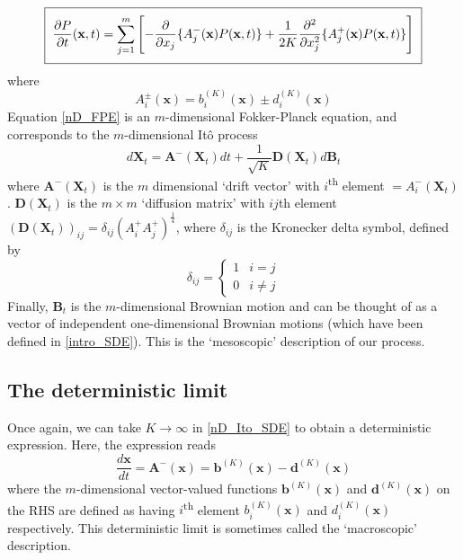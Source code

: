 \begin{equation}
\label{nD_FPE}
\setlength{\fboxsep}{2\fboxsep}\boxed{\frac{\partial P}{\partial t}(\mathbf{x},t) = \sum\limits_{j=1}^{m}\left[-\frac{\partial}{\partial x_j}\{A_j^{-}(\mathbf{x})P(\mathbf{x},t)\} + \frac{1}{2K}\frac{\partial^2}{\partial x_j^2}\{A_j^{+}(\mathbf{x})P(\mathbf{x},t)\}\right]}
\end{equation}
where
\begin{equation*}
A_{i}^{\pm}(\mathbf{x}) = b^{(K)}_i(\mathbf{x})\pm d^{(K)}_i(\mathbf{x})
\end{equation*}
Equation \eqref{nD_FPE} is an $m$-dimensional Fokker-Planck equation, and corresponds to the $m$-dimensional It\^o process
\begin{equation}
\label{nD_Ito_SDE}
d\mathbf{X}_{t} = \mathbf{A^-}(\mathbf{X}_t)dt + \frac{1}{\sqrt{K}}\mathbf{D}(\mathbf{X}_t)d\mathbf{B}_t
\end{equation}
where $\mathbf{A^-}(\mathbf{X}_t)$ is the $m$ dimensional `drift vector' with $i$\textsuperscript{th} element $ = A^{-}_{i}(\mathbf{X}_t)$. $\mathbf{D}(\mathbf{X}_t)$ is the $m \times m$ `diffusion matrix' with $ij$th element $\left(\mathbf{D}(\mathbf{X}_t)\right)_{ij} = \delta_{ij}\left(A^{+}_{i}A^{+}_{j}\right)^{\frac{1}{4}}$, where $\delta_{ij}$ is the Kronecker delta symbol, defined by
\begin{equation*}
\delta_{ij} = 
\begin{cases}
1 & i=j\\
0 & i\neq j
\end{cases}
\end{equation*}
Finally, $\mathbf{B}_t$ is the $m$-dimensional Brownian motion and can be thought of as a vector of independent one-dimensional Brownian motions (which have been defined in \ref{intro_SDE}). This is the `mesoscopic' description of our process.

\subsection{The deterministic limit}\label{sec_nD_det_limit}
Once again, we can take $K \to \infty$ in \eqref{nD_Ito_SDE} to obtain a deterministic expression. Here, the expression reads
\begin{equation}
\label{nD_det_limit}
\frac{d\mathbf{x}}{dt} = \mathbf{A^-}(\mathbf{x}) = \mathbf{b}^{(K)}(\mathbf{x}) - \mathbf{d}^{(K)}(\mathbf{x})
\end{equation}
where the $m$-dimensional vector-valued functions $\mathbf{b}^{(K)}(\mathbf{x})$ and $\mathbf{d}^{(K)}(\mathbf{x})$ on the RHS are defined as having $i$\textsuperscript{th} element $b^{(K)}_i(\mathbf{x})$ and $d^{(K)}_i(\mathbf{x})$ respectively. This deterministic limit is sometimes called the `macroscopic' description.
